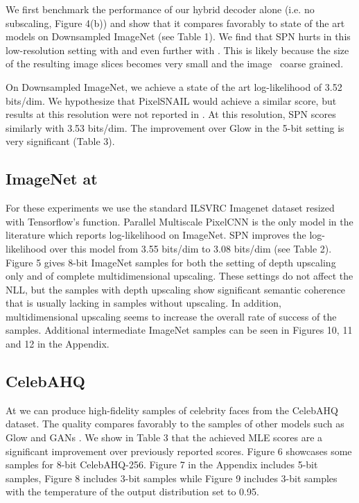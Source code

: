 \documentclass{article} \usepackage{iclr2019_conference,times}
\begin{document}
We first benchmark the performance of our hybrid decoder alone (i.e. no subscaling, Figure 4(b)) and show that it compares favorably to state of the art models on  Downsampled ImageNet (see Table 1). We find that SPN hurts in this low-resolution setting with  and even further with . This is likely because the size of the resulting image slices becomes very small and the image \ coarse grained.

On  Downsampled ImageNet, we achieve a state of the art log-likelihood of 3.52 bits/dim. We hypothesize that PixelSNAIL would achieve a similar score, but results at this resolution were not reported in \citet{pixelsnail}. At this resolution, SPN scores similarly with 3.53 bits/dim. 
The improvement over Glow in the 5-bit setting is very significant (Table 3). 

\subsection{ImageNet at }

For these experiments we use the standard ILSVRC Imagenet dataset \citep{imagenet} resized with Tensorflow's  function. Parallel Multiscale PixelCNN \citep{ParallelMultiscale} is the only model in the literature which reports log-likelihood on  ImageNet. SPN improves the log-likelihood over this model from 3.55 bits/dim 
to 3.08 bits/dim (see Table 2). Figure 5 gives  8-bit ImageNet samples for both the setting of depth upscaling only and of complete multidimensional upscaling. These settings do not affect the NLL, but the samples with depth upscaling show significant semantic coherence that is usually lacking in samples without upscaling. In addition, multidimensional upscaling seems to increase the overall rate of success of the samples.
Additional intermediate ImageNet samples can be seen in Figures 10, 11 and 12 in the Appendix.

\subsection{CelebAHQ}

 At  we can produce high-fidelity samples of celebrity faces from the CelebAHQ dataset. The quality compares favorably to the samples of other models such as Glow and GANs \citep{ProGAN}. We show in Table 3 that the achieved MLE scores are a significant improvement over previously reported scores. Figure 6 showcases some samples for 8-bit CelebAHQ-256. Figure 7 in the Appendix includes 5-bit samples,  Figure 8 includes 3-bit samples while Figure 9 includes 3-bit samples with the temperature of the output distribution set to 0.95.
\end{document}
